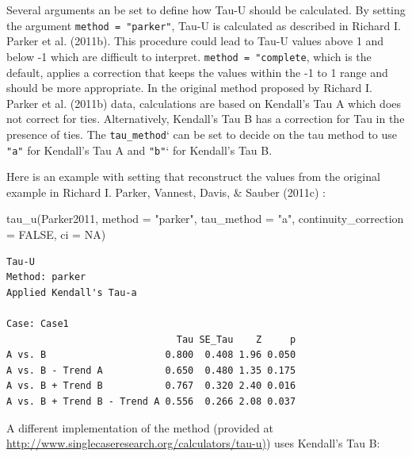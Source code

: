\documentclass[
  letterpaper,
  DIV=11,
  numbers=noendperiod]{scrreprt}
\newenvironment{Shaded}{\begin{snugshade}}{\end{snugshade}}
\newcommand{\AttributeTok}[1]{\textcolor[rgb]{0.40,0.45,0.13}{#1}}
\newcommand{\ConstantTok}[1]{\textcolor[rgb]{0.56,0.35,0.01}{#1}}
\newcommand{\FunctionTok}[1]{\textcolor[rgb]{0.28,0.35,0.67}{#1}}
\newcommand{\NormalTok}[1]{\textcolor[rgb]{0.00,0.23,0.31}{#1}}
\newcommand{\SpecialCharTok}[1]{\textcolor[rgb]{0.37,0.37,0.37}{#1}}
\newcommand{\StringTok}[1]{\textcolor[rgb]{0.13,0.47,0.30}{#1}}
\begin{document}
Several arguments an be set to define how Tau-U should be calculated. By
setting the argument \texttt{method\ =\ "parker"}, Tau-U is calculated
as described in Richard I. Parker et al. (2011b). This procedure could
lead to Tau-U values above 1 and below -1 which are difficult to
interpret. \texttt{method\ =\ "complete}, which is the default, applies
a correction that keeps the values within the -1 to 1 range and should
be more appropriate. In the original method proposed by Richard I.
Parker et al. (2011b) data, calculations are based on Kendall's Tau A
which does not correct for ties. Alternatively, Kendall's Tau B has a
correction for Tau in the presence of ties. The \texttt{tau\_method}`
can be set to decide on the tau method to use \texttt{"a"} for Kendall's
Tau A and \texttt{"b"}` for Kendall's Tau B.

Here is an example with setting that reconstruct the values from the
original example in Richard I. Parker, Vannest, Davis, \& Sauber (2011c)
:

\begin{Shaded}
\begin{Highlighting}[]
\FunctionTok{tau\_u}\NormalTok{(Parker2011, }\AttributeTok{method =} \StringTok{"parker"}\NormalTok{, }\AttributeTok{tau\_method =} \StringTok{"a"}\NormalTok{, }\AttributeTok{continuity\_correction =} \ConstantTok{FALSE}\NormalTok{, }\AttributeTok{ci =} \ConstantTok{NA}\NormalTok{)}
\end{Highlighting}
\end{Shaded}

\begin{verbatim}
Tau-U
Method: parker 
Applied Kendall's Tau-a

Case: Case1 
                              Tau SE_Tau    Z     p
A vs. B                     0.800  0.408 1.96 0.050
A vs. B - Trend A           0.650  0.480 1.35 0.175
A vs. B + Trend B           0.767  0.320 2.40 0.016
A vs. B + Trend B - Trend A 0.556  0.266 2.08 0.037
\end{verbatim}

A different implementation of the method (provided at
\href{http://www.singlecaseresearch.org/calculators/tau-u}{http://www.singlecaseresearch.org/calculators/tau-u)})
uses Kendall's Tau B:

\begin{Shaded}
\end{Shaded}
\end{document}
